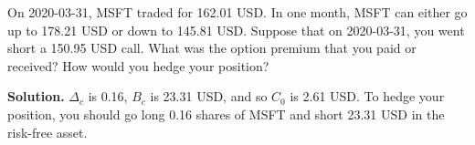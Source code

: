 \noindent On 2020-03-31, MSFT traded for 162.01 USD. In one month, MSFT can either go up to 178.21 USD or down to 145.81 USD. Suppose that on 2020-03-31, you went short a 150.95 USD call. What was the option premium that you paid or received? How would you hedge your position?

\vspace{9pt}

\noindent\textbf{Solution.} $\Delta_{c}$ is 0.16, $B_{c}$ is 23.31 USD, and so $C_{0}$ is 2.61 USD. To hedge your position, you should go long 0.16 shares of MSFT and short 23.31 USD in the risk-free asset.